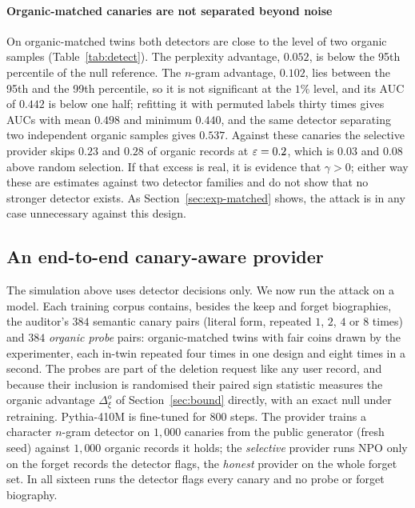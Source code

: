 \paragraph{Organic-matched canaries are not separated beyond noise} On organic-matched twins
both detectors are close to the level of two organic samples (Table~\ref{tab:detect}). The
perplexity advantage, $0.052$, is below the 95th percentile of the null reference. The
$n$-gram advantage, $0.102$, lies between the 95th and the 99th percentile, so it is not
significant at the $1\%$ level, and its AUC of $0.442$ is below one half; refitting it with
permuted labels thirty times gives AUCs with mean $0.498$ and minimum $0.440$, and the same
detector separating two independent organic samples gives $0.537$. Against these canaries the
selective provider skips $0.23$ and $0.28$ of organic records at $\varepsilon=0.2$, which is $0.03$
and $0.08$ above random selection. If that excess is real, it is evidence that $\gamma>0$;
either way these are estimates against two detector families and do not show that no stronger
detector exists. As Section~\ref{sec:exp-matched} shows, the attack is in any case
unnecessary against this design.

\subsection{An end-to-end canary-aware provider}\label{sec:exp-e2e}

The simulation above uses detector decisions only. We now run the attack on a model. Each
training corpus contains, besides the keep and forget biographies, the auditor's $384$
semantic canary pairs (literal form, repeated $1$, $2$, $4$ or $8$ times) and $384$
\emph{organic probe} pairs: organic-matched twins with fair coins drawn by the experimenter,
each in-twin repeated four times in one design and eight times in a second. The probes are
part of the deletion request like any user record, and because their inclusion is randomised
their paired sign statistic measures the organic advantage $\Delta^o_\xi$ of
Section~\ref{sec:bound} directly, with an exact null under retraining. Pythia-410M is
fine-tuned for $800$ steps. The provider trains a character $n$-gram detector on $1{,}000$
canaries from the public generator (fresh seed) against $1{,}000$ organic records it holds;
the \emph{selective} provider runs NPO only on the forget records the detector flags, the
\emph{honest} provider on the whole forget set. In all sixteen runs the detector flags every
canary and no probe or forget biography.

